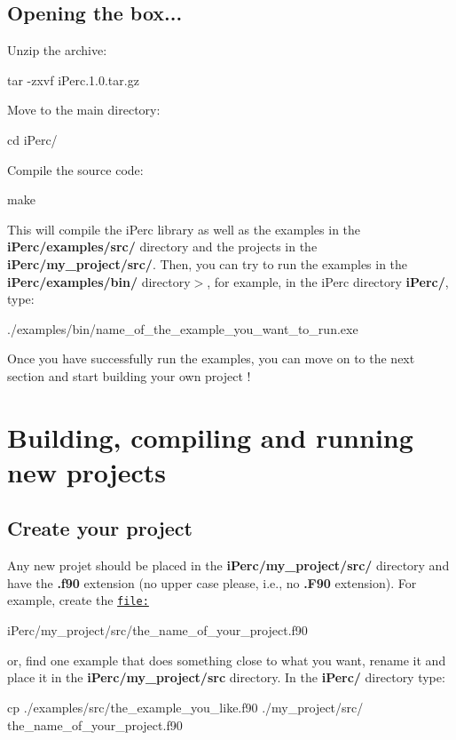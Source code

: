 \hypertarget{index_opening_the_box_sec}{}\subsection{\-Opening the box...}\label{index_opening_the_box_sec}
\-Unzip the archive\-: 
\begin{DoxyCode}
 tar -zxvf iPerc.1.0.tar.gz 
\end{DoxyCode}
 \-Move to the main directory\-: 
\begin{DoxyCode}
 cd iPerc/ 
\end{DoxyCode}
 \-Compile the source code\-: 
\begin{DoxyCode}
 make 
\end{DoxyCode}
 \-This will compile the i\-Perc library as well as the examples in the {\bfseries i\-Perc/examples/src/} directory and the projects in the {\bfseries i\-Perc/my\-\_\-project/src/}. \-Then, you can try to run the examples in the {\bfseries i\-Perc/examples/bin/} directory$>$, for example, in the i\-Perc directory {\bfseries i\-Perc/}, type\-: 
\begin{DoxyCode}
 ./examples/bin/name\_of\_the\_example\_you\_want\_to\_run.exe 
\end{DoxyCode}
 \-Once you have successfully run the examples, you can move on to the next section and start building your own project ! \hypertarget{index_project}{}\section{\-Building, compiling and running new projects}\label{index_project}
\hypertarget{index_new_project}{}\subsection{\-Create your project}\label{index_new_project}
\-Any new projet should be placed in the {\bfseries i\-Perc/my\-\_\-project/src/} directory and have the {\bfseries .f90} extension (no upper case please, i.\-e., no {\bfseries .\-F90} extension). \-For example, create the \href{file:}{\tt file\-:} 
\begin{DoxyCode}
 iPerc/my\_project/src/the\_name\_of\_your\_project.f90
\end{DoxyCode}
 or, find one example that does something close to what you want, rename it and place it in the {\bfseries i\-Perc/my\-\_\-project/src} directory. \-In the {\bfseries i\-Perc/} directory type\-: 
\begin{DoxyCode}
 cp ./examples/src/the\_example\_you\_like.f90 ./my\_project/src/
      the\_name\_of\_your\_project.f90
\end{DoxyCode}
